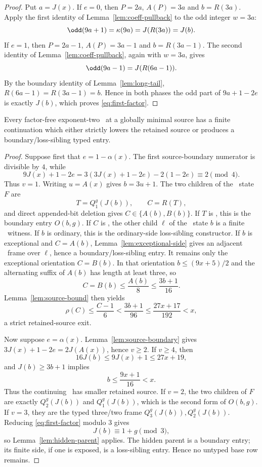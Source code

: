 \begin{proof}
Put $a=J(x)$. If $e=0$, then $P=2a$, $A(P)=3a$ and $b=R(3a)$.
Apply the first identity of Lemma~\ref{lem:coeff-pullback} to the odd integer
$w=3a$:
\[
 \odd(9a+1)=\kappa(9a)=J(R(3a))=J(b).
\]
If $e=1$, then $P=2a-1$, $A(P)=3a-1$ and $b=R(3a-1)$. The second identity
of Lemma~\ref{lem:coeff-pullback}, again with $w=3a$, gives
\[
 \odd(9a-1)=J(R(6a-1)).
\]
By the boundary identity of Lemma~\ref{lem:long-tail},
$R(6a-1)=R(3a-1)=b$. Hence in both phases the odd part of
$9a+1-2e$ is exactly $J(b)$, which proves \eqref{eq:first-factor}.
\end{proof}

\begin{proposition}\label{prop:base-entry}
Every factor-free exponent-two \DRAW\ at a globally minimal source has a
finite continuation which either strictly lowers the retained source or
produces a boundary/loss-sibling typed entry.
\end{proposition}

\begin{proof}
Suppose first that $e=1-\alpha(x)$. The first source-boundary numerator is
divisible by $4$, while
\[
9J(x)+1-2e=3(3J(x)+1-2e)-2(1-2e)\equiv2\pmod4.
\]
Thus $v=1$. Writing $u=A(x)$ gives $b=3u+1$. The two children of the \DRAW\
state $F$ are
\[
  T=Q_1^g(J(b)),\qquad C=R(T),
\]
and direct appended-bit deletion gives
$C\in\{A(b),B(b)\}$. If $T$ is \DRAW, this is the boundary entry
$O(b,g)$. If $C$ is \DRAW, the other child $\ell$ of the \WIN\ state $b$ is a
finite \LOSS\ witness. If $b$ is ordinary, this is the ordinary-side
loss-sibling constructor. If $b$ is exceptional and $C=A(b)$,
Lemma~\ref{lem:exceptional-side} gives an adjacent \DRAW\ frame over
$\ell$, hence a boundary/loss-sibling entry. It remains only the exceptional
orientation $C=B(b)$. In that orientation
$b\le(9x+5)/2$ and the alternating suffix of $A(b)$ has length at least three,
so
\[
 C=B(b)\le\frac{A(b)}8\le\frac{3b+1}{16}.
\]
Lemma~\ref{lem:source-bound} then yields
\[
 \rho(C)\le\frac{C-1}{6}<\frac{3b+1}{96}
 \le\frac{27x+17}{192}<x,
\]
a strict retained-source exit.

Now suppose $e=\alpha(x)$. Lemma~\ref{lem:source-boundary} gives
$3J(x)+1-2e=2J(A(x))$, hence $v\ge2$. If $v\ge4$, then
\[
16J(b)\le9J(x)+1\le27x+19,
\]
and $J(b)\ge3b+1$ implies
\[
  b\le\frac{9x+1}{16}<x.
\]
Thus the continuing \DRAW\ has smaller retained source. If $v=2$, the two
children of $F$ are exactly $Q_2^g(J(b))$ and $Q_1^g(J(b))$, which is the
second form of $O(b,g)$. If $v=3$, they are the typed three/two frame
$Q_3^g(J(b)),Q_2^g(J(b))$. Reducing
\eqref{eq:first-factor} modulo $3$ gives
\[
  J(b)\equiv1+g\pmod3,
\]
so Lemma~\ref{lem:hidden-parent} applies. The hidden parent is a boundary
entry; its finite side, if one is exposed, is a loss-sibling entry. Hence no
untyped base row remains.
\end{proof}

